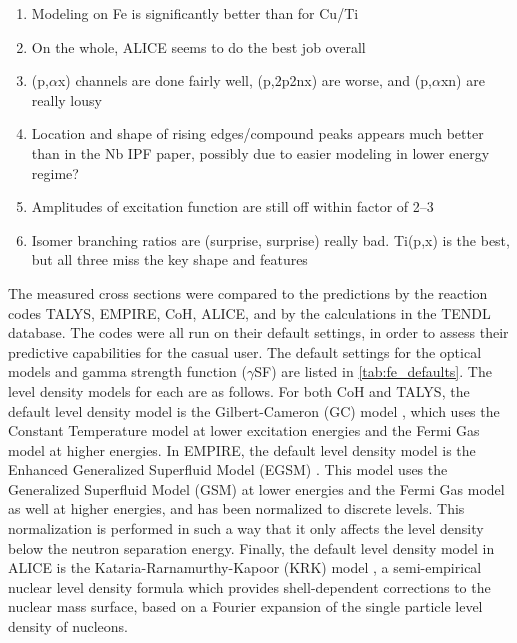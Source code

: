 \begin{enumerate}
 \item Modeling on Fe is significantly better than for Cu/Ti
 \item On the whole, ALICE seems to do the best job overall
 \item (p,$\alpha$x) channels are done fairly well, (p,2p2nx) are worse, and (p,$\alpha$xn) are really lousy
 \item Location and shape of rising edges/compound peaks appears much better than in the Nb IPF paper, possibly due to easier modeling in lower energy regime?
 \item Amplitudes of excitation function are still off within factor of 2--3
 \item Isomer branching ratios are (surprise, surprise) really bad.  Ti(p,x) is the best, but all three miss the key shape and features
\end{enumerate}

The measured cross sections were compared to the predictions by the reaction codes TALYS, EMPIRE, CoH, ALICE, and by the calculations in the TENDL database.
The codes were all run on their default settings, in order to assess their predictive capabilities for the casual user.
The default settings for the optical models and gamma strength function ($\gamma$SF) are listed in  \autoref{tab:fe_defaults}.
The level density models for each are as follows.
For both CoH and TALYS, the default level density model is the Gilbert-Cameron (GC) model \cite{Gilbert2011}, which uses the Constant Temperature model at lower excitation energies and the Fermi Gas model at higher energies.
In EMPIRE, the default level density model is the Enhanced Generalized Superfluid Model (EGSM) \cite{Giardina2002}.
This model uses the Generalized Superfluid Model (GSM) \cite{ignatyuk1979role,Ignatyuk1993} at lower energies and the Fermi Gas model as well at higher energies, and has been normalized to discrete levels.
This normalization is performed in such a way that it only affects the level density below the neutron separation energy.
Finally, the default level density model in ALICE is the Kataria-Rarnamurthy-Kapoor (KRK) model \cite{Kataria1978,Kataria1990}, a semi-empirical nuclear level density formula which provides shell-dependent corrections to the nuclear mass surface, based on a Fourier expansion of the single particle level density of nucleons.


